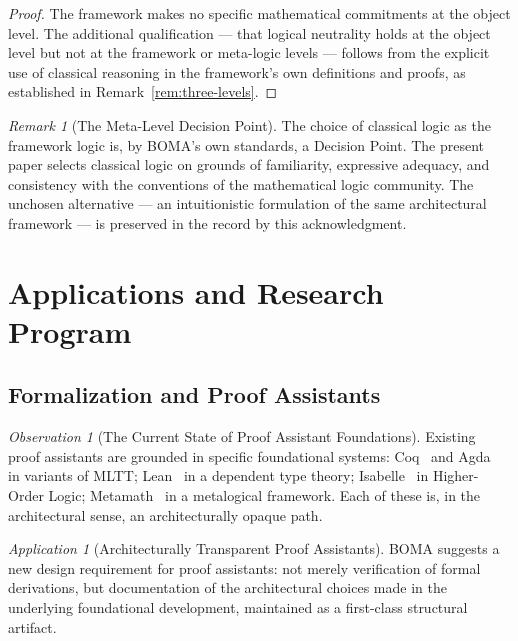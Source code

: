 \documentclass[12pt, a4paper]{article}
\theoremstyle{plain}
\theoremstyle{definition}
\theoremstyle{remark}
\newtheorem{remark}[theorem]{Remark}
\newtheorem{observation}[theorem]{Observation}
\newtheorem{application}[theorem]{Application}
\newcommand{\BOMA}{\textsf{BOMA}}
\begin{document}
\begin{proof}
The framework makes no specific mathematical commitments at the object
level. The additional qualification --- that logical neutrality holds
at the object level but not at the framework or meta-logic levels ---
follows from the explicit use of classical reasoning in the framework's
own definitions and proofs, as established in Remark~\ref{rem:three-levels}.
\end{proof}

\begin{remark}[The Meta-Level Decision Point]
\label{rem:meta-dp}
The choice of classical logic as the framework logic is, by \BOMA{}'s own
standards, a Decision Point. The present paper selects classical logic
on grounds of familiarity, expressive adequacy, and consistency with
the conventions of the mathematical logic community. The unchosen
alternative --- an intuitionistic formulation of the same architectural
framework --- is preserved in the record by this acknowledgment.
\end{remark}

\section{Applications and Research Program}
\label{sec:applications}

\subsection{Formalization and Proof Assistants}
\label{subsec:proof-assistants}

\begin{observation}[The Current State of Proof Assistant Foundations]
\label{obs:pa-current}
Existing proof assistants are grounded in specific foundational
systems: Coq~\cite{Coq2023} and Agda~\cite{Norell2007} in variants of
MLTT; Lean~\cite{deMouraEtAl2015} in a dependent type theory;
Isabelle~\cite{NipkowEtAl2002} in Higher-Order Logic; Metamath~\cite{Megill1997}
in a metalogical framework. Each of these is, in the architectural
sense, an architecturally opaque path.
\end{observation}

\begin{application}[Architecturally Transparent Proof Assistants]
\label{app:transparent-pa}
\BOMA{} suggests a new design requirement for proof assistants: not
merely verification of formal derivations, but documentation of the
architectural choices made in the underlying foundational development,
maintained as a first-class structural artifact.
\end{application}
\end{document}
